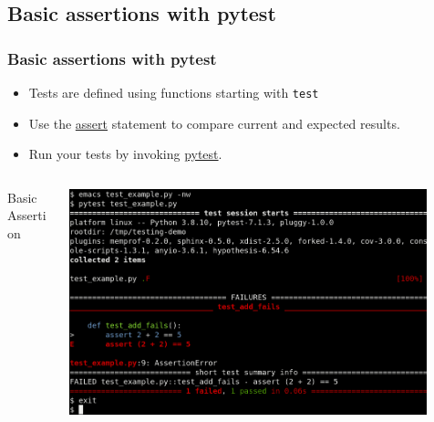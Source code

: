 \documentclass[t]{beamer}
\begin{document}
\subsection{Basic assertions with pytest}
\begin{frame}[fragile=singleslide]
  \frametitle{Basic assertions with pytest}

   \begin{itemize}
   \item Tests are defined using functions starting with \texttt{test}
   \item Use the \href{https://docs.python.org/3/reference/simple_stmts.html#the-assert-statement}{assert} statement to compare current and expected results.
   \item Run your tests by invoking \href{https://docs.pytest.org/en/7.1.x/how-to/usage.html}{pytest}.
   \end{itemize}

  \begin{columns}[T]
    \begin{column}{.5\textwidth}
      \begin{exampleblock}{Basic Assertion}
        \inputminted[fontsize=\footnotesize]{python}{code/basic_assertion.py}
      \end{exampleblock}
    \end{column}

    \begin{column}{.5\textwidth}
      \centering
      \href{https://asciinema.org/a/535234}{\includegraphics[width=0.9\textwidth]{figures/pytest_simple.png}}
    \end{column}
  \end{columns}

\end{frame}
\end{document}

